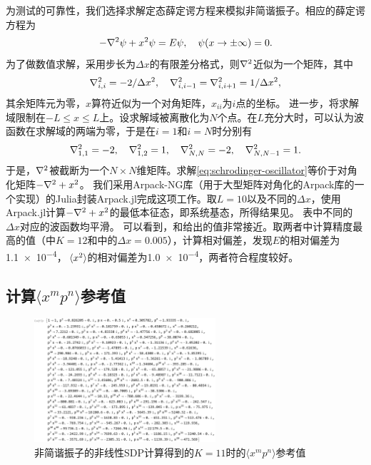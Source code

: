 \documentclass[oneside]{fduthesis}
\begin{document}
为测试的可靠性，我们选择求解定态薛定谔方程来模拟非简谐振子。相应的薛定谔方程为
\begin{equation}
    - \laplacian \psi + x^2 \psi = E \psi, \quad \psi(x \to \pm \infty) = 0.
    \label{eq:schrodinger-oscillator}
\end{equation}
为了做数值求解，采用步长为$\Delta x$的有限差分格式，则$\laplacian$近似为一个矩阵，其中
\begin{equation}
    \laplacian_{i, i} = -2 / \Delta x^2, \quad \laplacian_{i, i - 1} = \laplacian_{i, i+1} = 1 / \Delta x^2,
\end{equation}
其余矩阵元为零，$\hat{x}$算符近似为一个对角矩阵，$x_{ii}$为$i$点的坐标。
进一步，将求解域限制在$- L \leq x \leq L$上。设求解域被离散化为$N$个点。在$L$充分大时，可以认为波函数在求解域的两端为零，于是在$i=1$和$i = N$时分别有
\begin{equation}
    \laplacian_{1, 1} = -2, \quad \laplacian_{1, 2} = 1, \quad \laplacian_{N, N} = -2, \quad \laplacian_{N, N-1} = 1.
\end{equation}
于是，$\laplacian$被截断为一个$N \times N$维矩阵。求解\eqref{eq:schrodinger-oscillator}等价于对角化矩阵$-\laplacian + x^2$。
我们采用Arpack-NG库（用于大型矩阵对角化的Arpack库的一个实现）\cite{arpackcode}的Julia封装Arpack.jl\cite{arpackjl}完成这项工作。取$L=10$以及不同的$\Delta x$，使用Arpack.jl计算$-\laplacian + x^2$的最低本征态，即系统基态，所得结果见。
表中不同的$\Delta x$对应的波函数均平滑。
可以看到，和给出的值非常接近。取两者中计算精度最高的值（中$K=12$和中的$\Delta x = 0.005$），计算相对偏差，发现$E$的相对偏差为\num{1.1e-4}，$\expval*{x^2}$的相对偏差为\num{1.0e-4}，两者符合程度较好。

\subsection{计算$\langle x^m p^n \rangle$参考值}

\begin{figure}
    \centering
    \includegraphics[width=0.6\textwidth]{oscillator-expectations.pdf}
    \caption{非简谐振子的非线性SDP计算得到的$K=11$时的$\langle x^m p^n \rangle$参考值}
    \label{fig:oscillator-expectation}
\end{figure}
\end{document}
